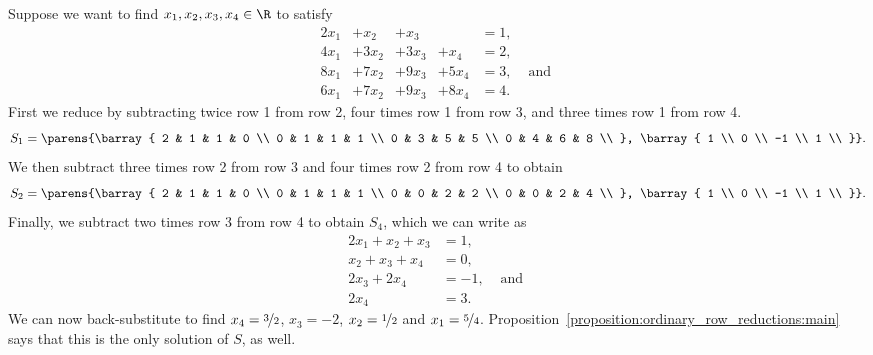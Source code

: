 Suppose we want to find $x_1, x_2, x_3, x_4 \in \R$ to satisfy
\[
	\begin{aligned}
	2x_1 &+ x_2  &+ x_3  &        &= 1,& \\
	4x_1 &+ 3x_2 &+ 3x_3 &+ x_4   &= 2,& \\
	8x_1 &+ 7x_2 &+ 9x_3 &+ 5x_4  &= 3,& \text{ and } \\
	6x_1 &+ 7x_2 &+ 9x_3 &+ 8x_4  &= 4.&
	\end{aligned}
\]
First we reduce by subtracting twice row 1 from row 2, four times row 1 from row 3, and three times row 1 from row 4.
\[
	S_1 = \parens{\barray{
	2 & 1 & 1 & 0 \\
	0 & 1 & 1 & 1 \\
	0 & 3 & 5 & 5 \\
	0 & 4 & 6 & 8 \\
	}, \barray{
		1 \\
		0 \\
		-1 \\
		1 \\
	}}.
\]
We then subtract three times row 2 from row 3 and four times row 2 from row 4 to obtain
\[
	S_2 = \parens{\barray{
	2 & 1 & 1 & 0 \\
	0 & 1 & 1 & 1 \\
	0 & 0 & 2 & 2 \\
	0 & 0 & 2 & 4 \\
	}, \barray{
		1 \\
		0 \\
		-1 \\
		1 \\
	}}.
\]
Finally, we subtract two times row 3 from row 4 to obtain $S_4$, which we can write as
\[
	\begin{aligned}
	 2x_1 + x_2 + x_3         &= 1,& \\
	        x_2 + x_3 + x_4  &= 0,& \\
	               2x_3 + 2x_4  &= -1,& \text{ and } \\
	                      2x_4  &= 3.&
	\end{aligned}
\]
We can now back-substitute to find $x_4 = \nicefrac{3}{2}$, $x_3 = -2$, $x_2 = \nicefrac{1}{2}$ and $x_1 = \nicefrac{5}{4}$.
Proposition~\ref{proposition:ordinary_row_reductions:main} says that this is the only solution of $S$, as well.
